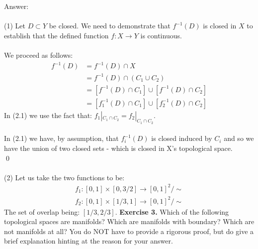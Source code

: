 \documentclass[12pt]{article}
\begin{document}
\vspace{1cm}
\noindent
Answer:\\
\\
(1) Let $D \subset Y$ be closed.  We need to demonstrate that $f^{-1}(D)$ is closed in $X$
to establish that the defined function $f: X \to Y$ is continuous.\\
\\
We proceed as follows:
\begin{align*}
    f^{-1}(D) &= f^{-1}(D) \cap X \\
 &= f^{-1}(D) \cap (C_1 \cup C_2) \\
 &= [f^{-1}(D) \cap C_1] \cup [f^{-1}(D) \cap C_2] \\
 &= [f_1^{-1}(D) \cap C_1] \cup [f_2^{-1}(D) \cap C_2] \tag{2.1}
\end{align*}
In (2.1) we use the fact that: $f_1|_{C_1 \cap C_2} = f_2|_{C_1 \cap C_2}$.\\
\\
In (2.1) we have, by assumption, that $f_i^{-1}(D)$ is closed induced by $C_i$ and so we have the union of two closed sets - which is closed in X's topological space.\\
\qed\\
\\
(2) Let us take the two functions to be:
\begin{align*}
    f_1 : [0,1] \times [0,3/2] \to [0,1]^2/ \sim \\
    f_2 : [0,1] \times [1/3,1] \to [0,1]^2/ \sim
\end{align*}
The set of overlap being: $[1/3, 2/3]$.
\newpage
\noindent\textbf{Exercise 3.} Which of the following topological spaces are
manifolds? Which are manifolds with boundary? Which are not manifolds at all?
You do NOT have to provide a rigorous proof, but do give a brief explanation
hinting at the reason for your answer.
\end{document}
